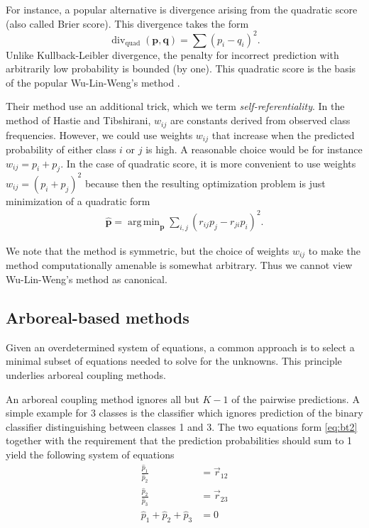 \documentclass[twoside,11pt]{article}
\DeclareMathOperator*{\divm}{div}
\DeclareMathOperator*{\argmin}{arg\,min}
\begin{document}
For instance, a popular alternative is divergence arising from the quadratic  score (also called Brier score).  This divergence takes the form
$$
\divm\nolimits_\textrm{quad} (\boldsymbol{p}, \boldsymbol{q})= \sum (p_i - q_i)^2.
$$
Unlike Kullback-Leibler divergence, the penalty for incorrect prediction with arbitrarily low probability is bounded (by one). This quadratic score is the basis of the popular Wu-Lin-Weng's method \cite{wu2004probability}. 

Their method use an additional trick, which we term \emph{self-referentiality}. In the method of Hastie and Tibshirani, $w_{ij}$ are constants derived from observed class frequencies. However, we could use weights $w_{ij}$ that increase when the predicted probability of either class $i$ or $j$ is high. A reasonable choice would be for instance $w_{ij}= p_i + p_j$. In the case of quadratic score, it is more convenient to use weights $w_{ij} = (p_i + p_j)^2$ because then the resulting optimization problem is just minimization of a quadratic form
\begin{align*}
\hat{\boldsymbol{p}} = \argmin_{\boldsymbol{p}} \sum_{i,j} (r_{ij}p_j - r_{ji}p_i)^2.
\end{align*}

We note that the method is symmetric, but the choice of weights $w_{ij}$ to make the method computationally amenable is somewhat arbitrary. Thus we cannot view Wu-Lin-Weng's method as canonical.

\subsection{Arboreal-based methods}


Given an overdetermined system of equations, a common approach is to select a minimal subset of equations needed to solve for the unknowns. This principle underlies arboreal coupling methods.

An arboreal coupling method ignores all but $K-1$ of the pairwise predictions. A simple example for 3 classes is the classifier which ignores prediction of the binary classifier distinguishing between classes 1 and 3. The two equations form \eqref{eq:bt2} together with the requirement that the prediction probabilities should sum to 1 yield the following system of equations
\begin{equation}
	\begin{split}
		\frac{\hat p_1}{\hat p_2} &= \vec{r}_{12}\\
		\frac{\hat p_2}{\hat p_3} &= \vec{r}_{23}\\
		\hat p_1 + \hat p_2 + \hat p_3 &= 0
	\end{split}
\end{equation}
\end{document}
